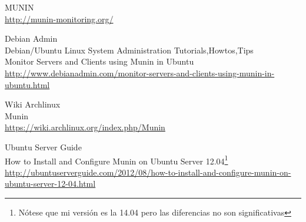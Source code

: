 \begin{thebibliography}{10}
MUNIN\\
  \url{http://munin-monitoring.org/}

Debian Admin\\
Debian/Ubuntu Linux System Administration Tutorials,Howtos,Tips\\
Monitor Servers and Clients using Munin in Ubuntu\\
  \url{http://www.debianadmin.com/monitor-servers-and-clients-using-munin-in-ubuntu.html}

Wiki Archlinux\\
Munin\\
  \url{https://wiki.archlinux.org/index.php/Munin}

Ubuntu Server Guide\\
How to Install and Configure Munin on Ubuntu Server 12.04\footnote{Nótese que mi
versión es la 14.04 pero las diferencias no son significativas}\\
  \url{http://ubuntuserverguide.com/2012/08/how-to-install-and-configure-munin-on-ubuntu-server-12-04.html}

\end{thebibliography}
